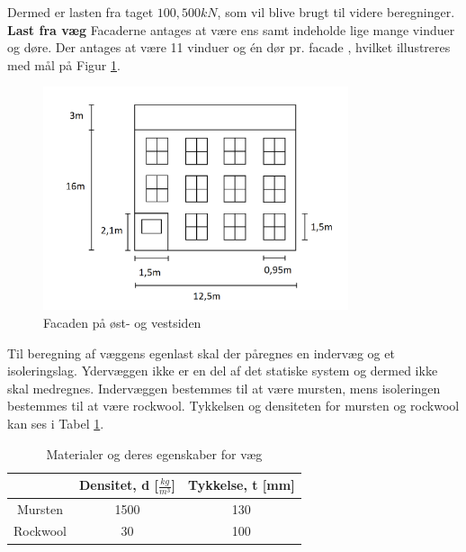 Dermed er lasten fra taget $100,\!500 kN$, som vil blive brugt til videre beregninger.
\newline
\newline
\textbf{Last fra væg}
\newline
Facaderne antages at være ens samt indeholde lige mange vinduer og døre. Der antages at være 11 vinduer og én dør pr. facade \citep{gammellokalplan}, hvilket illustreres med mål på Figur \ref{fig:facade}.

\begin{figure}[H]
	\centering
	\includegraphics[width=0.8\textwidth]{billeder/facadenord.png}
	\caption{Facaden på øst- og vestsiden}
	\label{fig:facade}
\end{figure}

Til beregning af væggens egenlast skal der påregnes en indervæg og et isoleringslag. Ydervæggen ikke er en del af det statiske system og dermed ikke skal medregnes. Indervæggen bestemmes til at være mursten, mens isoleringen bestemmes til at være rockwool. Tykkelsen og densiteten for mursten og rockwool kan ses i Tabel \ref{tab:murogwool}.

\begin{table}
	\begin{center}
		\begin{tabular}{|c|c|c|}
			\hline
			& Densitet, d [$\frac{kg}{m^3}$] & Tykkelse, t [mm] \\ \hline
			Mursten  & 1500  & 130     \\ \hline
			Rockwool & 30 & 100              \\ \hline
		\end{tabular}
		\caption{Materialer og deres egenskaber for væg \citep{murstendensitet} \citep{indervaeg} \citep{densitet} \citep{isolering}}
		\label{tab:murogwool}
	\end{center}
\end{table}


